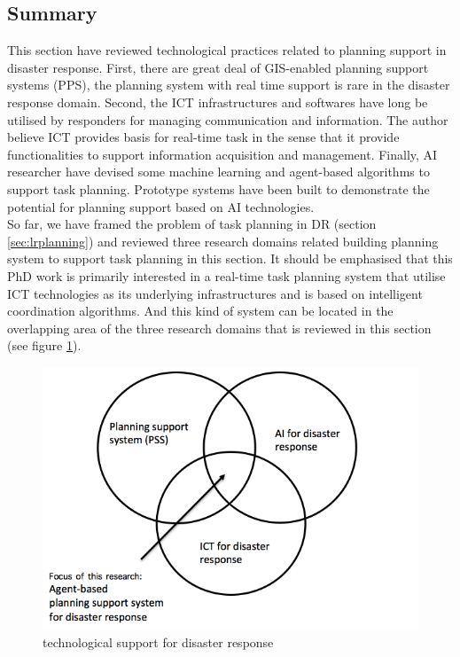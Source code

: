 \subsection{Summary}
This section have reviewed technological practices related to planning support in disaster response. First, there are great deal of GIS-enabled planning support systems (PPS), the planning system with real time support is rare in the disaster response domain. Second, the ICT infrastructures and softwares have long be utilised by responders for managing communication and information. The author believe ICT provides basis for real-time task in the sense that it provide functionalities to support information acquisition and management. Finally, AI researcher have devised some machine learning and agent-based algorithms to support task planning. Prototype systems have been built to demonstrate the potential for planning support based on AI technologies. \\

So far, we have framed the problem of task planning in DR (section \ref{sec:lrplanning}) and reviewed three research domains related building planning system to support task planning in this section. It should be emphasised that this PhD work is primarily interested in a real-time task planning system that utilise ICT technologies as its underlying infrastructures and is based on intelligent coordination algorithms. And this kind of system can be located in the overlapping area of the three research domains that is reviewed in this section (see figure \ref{fig:SystemFraming}).\\

\begin{figure}[h]
  \centering
  \includegraphics[width=1\textwidth]{img/background/SystemFraming}
  \caption{technological support for disaster response}
  \label{fig:SystemFraming}
\end{figure}


